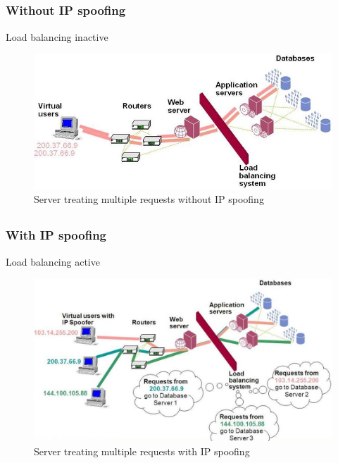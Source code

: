\documentclass[12pt]{beamer}
\begin{document}
\subsection{}
\begin{frame}[c]
\frametitle{Without IP spoofing}
Load balancing inactive
\begin{figure}
 \centering
 \includegraphics[width=12cm]{images/woip.jpg}
 \caption{Server treating multiple requests without IP spoofing}
\end{figure}
\end{frame}


\subsection{}
\begin{frame}[c]
\frametitle{With IP spoofing}
Load balancing active
\begin{figure}
 \centering
 \includegraphics[width=12cm]{images/wip.jpg}
 \caption{Server treating multiple requests with IP spoofing}
\end{figure}
\end{frame}
\end{document}
